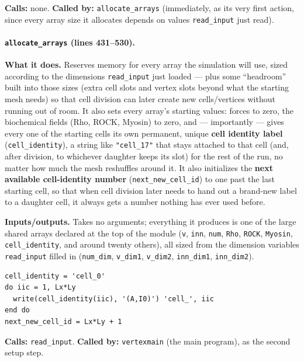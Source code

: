 \documentclass[11pt]{article}
\begin{document}
\textbf{Calls:} none. \textbf{Called by:} \texttt{allocate\_arrays} (immediately, as its
very first action, since every array size it allocates depends on values \texttt{read\_input}
just read).

\paragraph{\texttt{allocate\_arrays} (lines 431--530).}
\textbf{What it does.} Reserves memory for every array the simulation will use, sized
according to the dimensions \texttt{read\_input} just loaded --- plus some ``headroom''
built into those sizes (extra cell slots and vertex slots beyond what the starting mesh
needs) so that cell division can later create new cells/vertices without running out of
room. It also sets every array's starting values: forces to zero, the biochemical
fields (Rho, ROCK, Myosin) to zero, and --- importantly --- gives every one of the
starting cells its own permanent, unique \textbf{cell identity label}
(\texttt{cell\_identity}), a string like \texttt{"cell\_17"} that stays attached to that
cell (and, after division, to whichever daughter keeps its slot) for the rest of the
run, no matter how much the mesh reshuffles around it. It also initializes the
\textbf{next available cell-identity number} (\texttt{next\_new\_cell\_id}) to one past
the last starting cell, so that when cell division later needs to hand out a brand-new
label to a daughter cell, it always gets a number nothing has ever used before.

\textbf{Inputs/outputs.} Takes no arguments; everything it produces is one of the large
shared arrays declared at the top of the module (\texttt{v}, \texttt{inn}, \texttt{num},
\texttt{Rho}, \texttt{ROCK}, \texttt{Myosin}, \texttt{cell\_identity}, and around twenty
others), all sized from the dimension variables \texttt{read\_input} filled in
(\texttt{num\_dim}, \texttt{v\_dim1}, \texttt{v\_dim2}, \texttt{inn\_dim1}, \texttt{inn\_dim2}).

\begin{lstlisting}[caption={Giving every starting cell its permanent identity label, and priming the counter for future divisions.}]
cell_identity = 'cell_0'
do iic = 1, Lx*Ly
  write(cell_identity(iic), '(A,I0)') 'cell_', iic
end do
next_new_cell_id = Lx*Ly + 1
\end{lstlisting}

\textbf{Calls:} \texttt{read\_input}. \textbf{Called by:} \texttt{vertexmain} (the main
program), as the second setup step.
\end{document}
